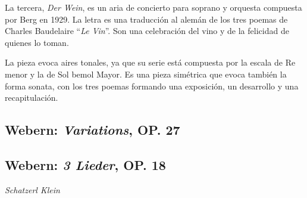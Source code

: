         
        La tercera, \textit{Der Wein}, es un aria de concierto para soprano y orquesta compuesta por Berg en 1929. La letra es una traducción al alemán de los tres poemas de Charles Baudelaire ``\textit{Le Vin}''. Son una celebración del vino y de la felicidad de quienes lo toman.
        
        La pieza evoca aires tonales, ya que su serie está compuesta por la escala de Re menor y la de Sol bemol Mayor. Es una pieza simétrica que evoca también la forma sonata, con los tres poemas formando una exposición, un desarrollo y una recapitulación.
        
        
        \subsection*{Webern: \textit{Variations}, OP. 27}     
        
        
        \subsection*{Webern: \textit{3 Lieder}, OP. 18}
        \textit{Schatzerl Klein}
        
